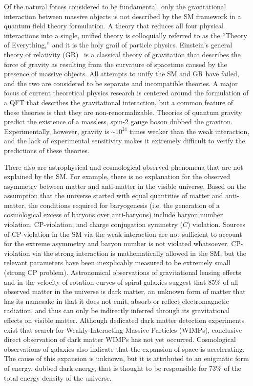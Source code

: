 Of the natural forces considered to be fundamental, only the gravitational interaction between massive objects is not described by the SM framework in a quantum field theory formulation.
A theory that reduces all four physical interactions into a single, unified theory is colloquially referred to as the ``Theory of Everything,'' and it is the holy grail of particle physics.
Einstein's general theory of relativity (GR)~\cite{einstein1915feldgleichungen} is a classical theory of gravitation that describes the force of gravity as resulting from the curvature of spacetime caused by the presence of massive objects.
All attempts to unify the SM and GR have failed, and the two are considered to be separate and incompatible theories.
A major focus of current theoretical physics research is centered around the formulation of a QFT that describes the gravitational interaction, but a common feature of these theories is that they are non-renormalizable.
Theories of quantum gravity predict the existence of a massless, spin-2 gauge boson dubbed the graviton.
Experimentally, however, gravity is \sim$10^{24}$ times weaker than the weak interaction, and the lack of experimental sensitivity makes it extremely difficult to verify the predictions of these theories.

There also are astrophysical and cosmological observed phenomena that are not explained by the SM.
For example, there is no explanation for the observed asymmetry between matter and anti-matter in the visible universe.
Based on the assumption that the universe started with equal quantities of matter and anti-matter, the conditions required for baryogenesis (i.e. the generation of a cosmological excess of baryons over anti-baryons) include baryon number violation, CP-violation, and charge conjugation symmetry ($C$) violation.
Sources of CP-violation in the SM via the weak interaction are not sufficient to account for the extreme asymmetry and baryon number is not violated whatsoever.
CP-violation via the strong interaction is mathematically allowed in the SM, but the relevant parameters have been inexplicably measured to be extremely small (strong CP problem).
Astronomical observations of gravitational lensing effects and in the velocity of rotation curves of spiral galaxies suggest that $85 \%$ of all observed matter in the universe is dark matter, an unknown form of matter that has its namesake in that it does not emit, absorb or reflect electromagnetic radiation, and thus can only be indirectly inferred through its gravitational effects on visible matter.
Although dedicated dark matter detection experiments exist that search for Weakly Interacting Massive Particles (WIMPs), conclusive direct observation of dark matter WIMPs has not yet occurred.
Cosmological observations of galaxies also indicate that the expansion of space is accelerating.
The cause of this expansion is unknown, but it is attributed to an enigmatic form of energy, dubbed dark energy, that is thought to be responsible for $73 \%$ of the total energy density of the universe.

